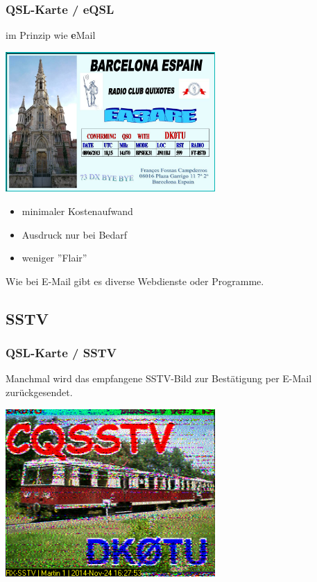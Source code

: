 \begin{frame}
    \frametitle{QSL-Karte / eQSL}

    im Prinzip wie \textbf{e}Mail

    \begin{center}
        \includegraphics[width=0.6\textwidth]{bv13/eQSL_DK0TU-EA3ARE.jpg}
        \tiny \hyperlink{refs}{\cite{wc}}
    \end{center}

    \begin{itemize}
        \item minimaler Kostenaufwand
        \item Ausdruck nur bei Bedarf
        \item weniger ''Flair''
    \end{itemize}

    Wie bei E-Mail gibt es diverse Webdienste oder Programme.

\end{frame}

\subsection{SSTV}

\begin{frame}
    \frametitle{QSL-Karte / SSTV}

    Manchmal wird das empfangene SSTV-Bild zur Bestätigung per E-Mail
    zurückgesendet.

    \begin{center}
        \includegraphics[width=0.6\textwidth]{bv13/QSL_SSTV_2014-11-24_162753.png}
    \end{center}

\end{frame}

